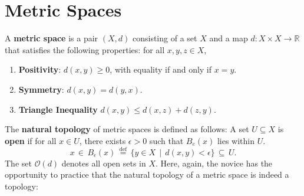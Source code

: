 \documentclass[11pt]{article}
\renewcommand{\O}{\mathcal{O}}
\begin{document}

\section{Metric Spaces}

A \textbf{metric space} is a pair $(X, d)$ consisting of a set $X$ and a map $d : X \times X \to \mathbb{R}$ that satisfies the following properties: for all $x, y, z \in X$,
\begin{enumerate}
  \item \textbf{Positivity}: $d(x, y) \ge 0$, with equality if and only if $x = y$.
  \item \textbf{Symmetry}: $d(x, y) = d(y, x)$.
  \item \textbf{Triangle Inequality} $d(x, y) \le d(x, z) + d(z, y)$.
\end{enumerate}
The \textbf{natural topology} of metric spaces is defined as follows: A set $U \subseteq X$ is \textbf{open} if for all $x \in U$, there exists $\epsilon > 0$ such that $B_{e}(x)$ lies within $U$.
\[
  x \, \in \,  B_{\epsilon}(x) \, \stackrel{\text{def}}{=} \, \{ y \in X \, \mid \, d(x, y) < \epsilon \} \, \subseteq \, U.
\]
The set $\O(d)$ denotes all open sets in $X$. Here, again, the novice has the opportunity to practice that the natural topology of a metric space is indeed a topology:
\end{document}
